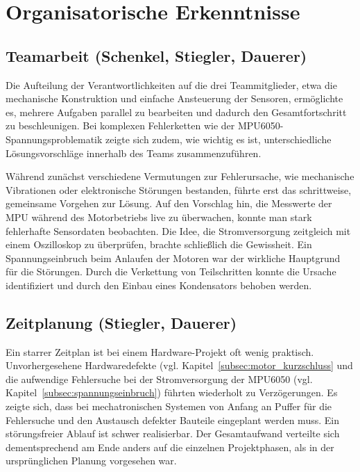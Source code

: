 \documentclass[fontsize=12pt,
parskip=half,	%
department=FakM,  %
logostyle=flat,
twoside, %
DIV=15,BCOR=10mm, %
]{OTHRreprt}
\begin{document}
\section{Organisatorische Erkenntnisse}
\label{sec:organisatorische_erkenntnisse}

\subsection{Teamarbeit (Schenkel, Stiegler, Dauerer)}
\label{subsec:lessons_teamarbeit}

Die Aufteilung der Verantwortlichkeiten auf die drei Teammitglieder, etwa die mechanische Konstruktion und einfache Ansteuerung der Sensoren, ermöglichte es, mehrere Aufgaben parallel zu bearbeiten und dadurch den Gesamtfortschritt zu beschleunigen. Bei komplexen Fehlerketten wie der MPU6050-Spannungsproblematik zeigte sich zudem, wie wichtig es ist, unterschiedliche Lösungsvorschläge innerhalb des Teams zusammenzuführen.

Während zunächst verschiedene Vermutungen zur Fehlerursache, wie mechanische Vibrationen oder elektronische Störungen bestanden, führte erst das schrittweise, gemeinsame Vorgehen zur Lösung. Auf den Vorschlag hin, die Messwerte der MPU während des Motorbetriebs live zu überwachen, konnte man stark fehlerhafte Sensordaten beobachten. Die Idee, die Stromversorgung zeitgleich mit einem Oszilloskop zu überprüfen, brachte schließlich die Gewissheit. Ein Spannungseinbruch beim Anlaufen der Motoren war der wirkliche Hauptgrund für die Störungen. Durch die Verkettung von Teilschritten konnte die Ursache identifiziert und durch den Einbau eines Kondensators behoben werden.

\subsection{Zeitplanung (Stiegler, Dauerer)}
\label{subsec:lessons_zeitplanung}

Ein starrer Zeitplan ist bei einem Hardware-Projekt oft wenig praktisch. Unvorhergesehene Hardwaredefekte (vgl. Kapitel~\ref{subsec:motor_kurzschluss} und die aufwendige Fehlersuche bei der Stromversorgung der MPU6050 (vgl. Kapitel~\ref{subsec:spannungseinbruch}) führten wiederholt zu Verzögerungen. Es zeigte sich, dass bei mechatronischen Systemen von Anfang an Puffer für die Fehlersuche und den Austausch defekter Bauteile eingeplant werden muss. Ein störungsfreier Ablauf ist schwer realisierbar. Der Gesamtaufwand verteilte sich dementsprechend am Ende anders auf die einzelnen Projektphasen, als in der ursprünglichen Planung vorgesehen war.
\end{document}
